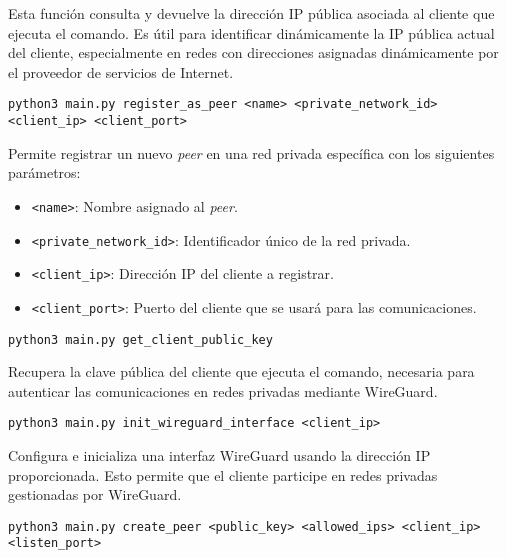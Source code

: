     Esta función consulta y devuelve la dirección IP pública asociada al cliente que ejecuta el comando. Es útil para identificar dinámicamente la IP pública actual del cliente, especialmente en redes con direcciones asignadas dinámicamente por el proveedor de servicios de Internet.
    
    \begin{Verbatim}[breaklines=true]
        python3 main.py register_as_peer <name> <private_network_id> <client_ip> <client_port>
    \end{Verbatim}
        
    Permite registrar un nuevo \textit{peer} en una red privada específica con los siguientes parámetros:  
    \begin{itemize}
        \item \texttt{<name>}: Nombre asignado al \textit{peer}.
        \item \texttt{<private\_network\_id>}: Identificador único de la red privada.
        \item \texttt{<client\_ip>}: Dirección IP del cliente a registrar.
        \item \texttt{<client\_port>}: Puerto del cliente que se usará para las comunicaciones.
    \end{itemize}
        

    \begin{Verbatim}[breaklines=true]
    python3 main.py get_client_public_key
    \end{Verbatim} 
    Recupera la clave pública del cliente que ejecuta el comando, necesaria para autenticar las comunicaciones en redes privadas mediante WireGuard.
    
   
    
    \begin{Verbatim}[breaklines=true]
    python3 main.py init_wireguard_interface <client_ip>
    \end{Verbatim} 
    Configura e inicializa una interfaz WireGuard usando la dirección IP proporcionada. Esto permite que el cliente participe en redes privadas gestionadas por WireGuard.
    
   
    
    \begin{Verbatim}[breaklines=true]
        python3 main.py create_peer <public_key> <allowed_ips> <client_ip> <listen_port>
    \end{Verbatim}
        
